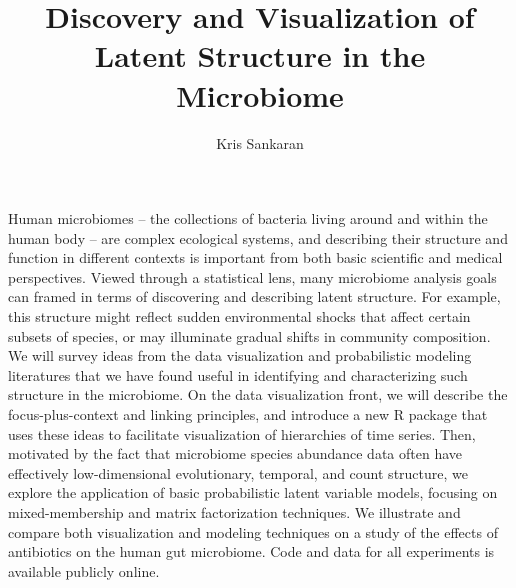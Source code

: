 \documentclass{article}
\title{Discovery and Visualization of Latent Structure in the Microbiome}
\author{Kris Sankaran}
\begin{document}
Human microbiomes -- the collections of bacteria living around and within the
human body -- are complex ecological systems, and describing their structure and
function in different contexts is important from both basic scientific and
medical perspectives. Viewed through a statistical lens, many microbiome
analysis goals can framed in terms of discovering and describing latent
structure. For example, this structure might reflect sudden environmental shocks
that affect certain subsets of species, or may illuminate gradual shifts in
community composition. We will survey ideas from the data visualization and
probabilistic modeling literatures that we have found useful in identifying and
characterizing such structure in the microbiome. On the data visualization
front, we will describe the focus-plus-context and linking principles, and
introduce a new R package that uses these ideas to facilitate visualization of
hierarchies of time series. Then, motivated by the fact that microbiome species
abundance data often have effectively low-dimensional evolutionary, temporal,
and count structure, we explore the application of basic probabilistic latent
variable models, focusing on mixed-membership and matrix factorization
techniques. We illustrate and compare both visualization and modeling techniques
on a study of the effects of antibiotics on the human gut microbiome. Code and
data for all experiments is available publicly online.
\end{document}
